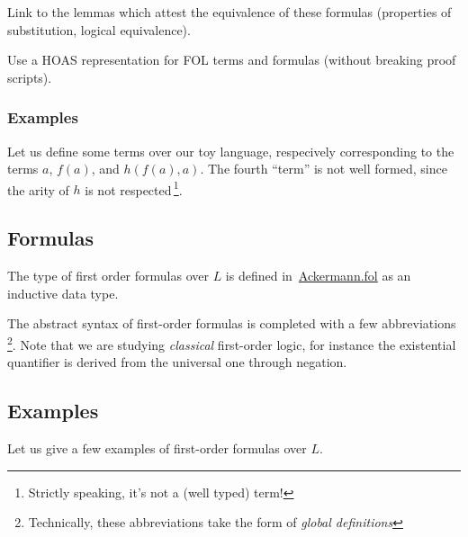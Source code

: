 
  \begin{todo}
   Link to the lemmas which attest the equivalence of these formulas (properties of substitution, logical equivalence).
  \end{todo}


  \begin{project}
 Use a HOAS representation for FOL terms and formulas (without breaking proof scripts).   
  \end{project}

\subsubsection{Examples}
\label{sect:folTermExamples}

Let us define some \gallina terms over our toy language, respecively corresponding to the terms $a$,
$f(a)$, and $h(f(a),a)$. The fourth ``term'' is not well formed, since the arity of $h$ is not respected\,\footnote{Strictly speaking, it's not a (well typed) term!}.




\subsection{Formulas}



The type of first order formulas over $L$ is defined 
in~\href{../theories/html/hydras.Ackermann.fol.html}{Ackermann.fol} as an inductive data type.


The  abstract syntax of first-order formulas is completed 
with a few abbreviations\,\footnote{Technically, these abbreviations take the form of \emph{global definitions}}. Note that we are studying \emph{classical} first-order logic, for instance the existential quantifier is derived from the universal one through negation. 


\subsection{Examples}
\label{sect:folFormExamples}



Let us give a few examples of first-order formulas over $L$.

